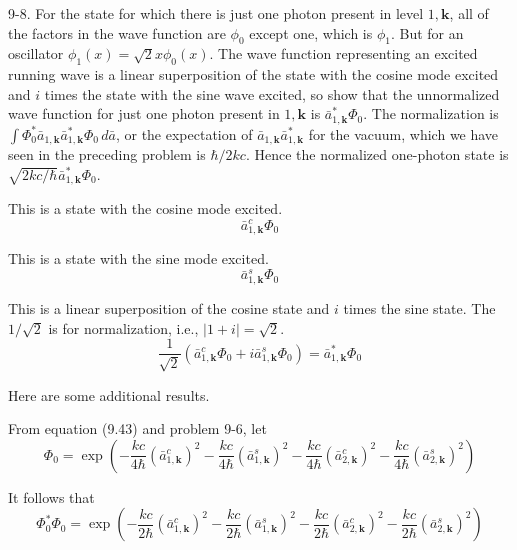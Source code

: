 \documentclass[12pt]{article}
\begin{document}
9-8.
For the state for which there is just one photon
present in level $1,\mathbf k$, all of the factors in the wave function are
$\phi_0$ except one, which is $\phi_1$.
But for an oscillator $\phi_1(x)=\sqrt2x\phi_0(x)$.
The wave function representing an excited running wave is a linear
superposition of the state with the cosine mode excited and $i$
times the state with the sine wave excited, so show that the
unnormalized wave function for just one photon present in
$1,\mathbf k$ is $\bar a_{1,\mathbf k}^*\Phi_0$.
The normalization is
$\int\Phi_0^*\bar a_{1,\mathbf k}\bar a_{1,\mathbf k}^*\Phi_0\,d\bar a$,
or the expectation of $\bar a_{1,\mathbf k}\bar a_{1,\mathbf k}^*$ for the
vacuum, which we have seen in the preceding problem is $\hbar/2kc$.
Hence the normalized one-photon state is
$\sqrt{2kc/\hbar}\bar a_{1,\mathbf k}^*\Phi_0$.

\bigskip
This is a state with the cosine mode excited.
\begin{equation*}
\bar a_{1,\mathbf k}^c\Phi_0
\end{equation*}

This is a state with the sine mode excited.
\begin{equation*}
\bar a_{1,\mathbf k}^s\Phi_0
\end{equation*}

This is a linear superposition of the cosine state and $i$ times the sine state.
The $1/\sqrt2$ is for normalization, i.e., $|1+i|=\sqrt2$.
\begin{equation*}
\frac{1}{\sqrt2}(\bar a_{1,\mathbf k}^c\Phi_0+i\bar a_{1,\mathbf k}^s\Phi_0)
=\bar a_{1,\mathbf k}^*\Phi_0
\end{equation*}

Here are some additional results.

\bigskip
From equation (9.43) and problem 9-6, let
\begin{equation*}
\Phi_0=\exp\left(
-\frac{kc}{4\hbar}(\bar a_{1,\mathbf k}^c)^2-\frac{kc}{4\hbar}(\bar a_{1,\mathbf k}^s)^2
-\frac{kc}{4\hbar}(\bar a_{2,\mathbf k}^c)^2-\frac{kc}{4\hbar}(\bar a_{2,\mathbf k}^s)^2
\right)
\end{equation*}

It follows that
\begin{equation*}
\Phi_0^*\Phi_0=\exp\left(
-\frac{kc}{2\hbar}(\bar a_{1,\mathbf k}^c)^2-\frac{kc}{2\hbar}(\bar a_{1,\mathbf k}^s)^2
-\frac{kc}{2\hbar}(\bar a_{2,\mathbf k}^c)^2-\frac{kc}{2\hbar}(\bar a_{2,\mathbf k}^s)^2
\right)
\end{equation*}
\end{document}
